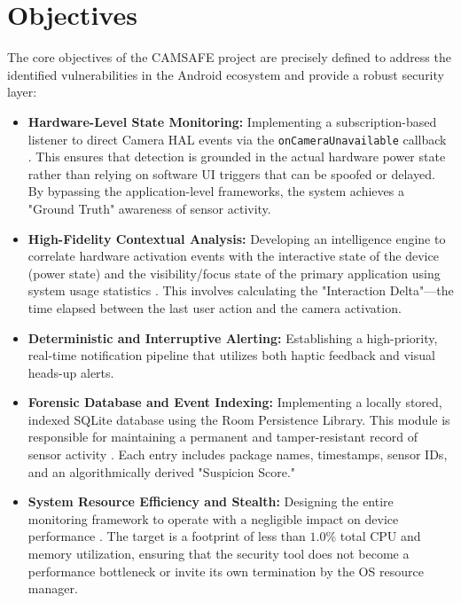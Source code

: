 \documentclass[12pt,a4paper]{report}
\begin{document}
    \section{Objectives}
    The core objectives of the CAMSAFE project are precisely defined to address the identified vulnerabilities in the Android ecosystem and provide a robust security layer:
    \begin{itemize}
        \item \textbf{Hardware-Level State Monitoring:} Implementing a subscription-based listener to direct Camera HAL events via the \texttt{onCameraUnavailable} callback \cite{androidhal}. This ensures that detection is grounded in the actual hardware power state rather than relying on software UI triggers that can be spoofed or delayed. By bypassing the application-level frameworks, the system achieves a "Ground Truth" awareness of sensor activity.
        \item \textbf{High-Fidelity Contextual Analysis:} Developing an intelligence engine to correlate hardware activation events with the interactive state of the device (power state) and the visibility/focus state of the primary application using system usage statistics \cite{contextaware}. This involves calculating the "Interaction Delta"—the time elapsed between the last user action and the camera activation.
        \item \textbf{Deterministic and Interruptive Alerting:} Establishing a high-priority, real-time notification pipeline that utilizes both haptic feedback and visual heads-up alerts. 
        \item \textbf{Forensic Database and Event Indexing:} Implementing a locally stored, indexed SQLite database using the Room Persistence Library. This module is responsible for maintaining a permanent and tamper-resistant record of sensor activity \cite{smarthome}. Each entry includes package names, timestamps, sensor IDs, and an algorithmically derived "Suspicion Score."
        \item \textbf{System Resource Efficiency and Stealth:} Designing the entire monitoring framework to operate with a negligible impact on device performance \cite{edgecomp}. The target is a footprint of less than $1.0\%$ total CPU and memory utilization, ensuring that the security tool does not become a performance bottleneck or invite its own termination by the OS resource manager.
    \end{itemize}
\end{document}
